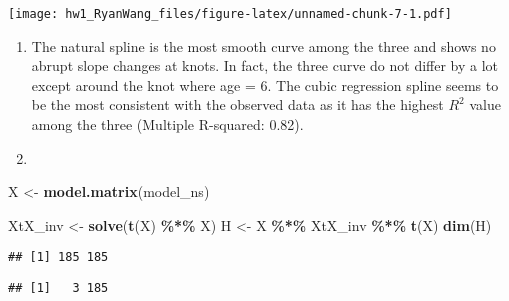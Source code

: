 \documentclass[
]{article}
\newenvironment{Shaded}{\begin{snugshade}}{\end{snugshade}}
\newcommand{\CommentTok}[1]{\textcolor[rgb]{0.56,0.35,0.01}{\textit{#1}}}
\newcommand{\ControlFlowTok}[1]{\textcolor[rgb]{0.13,0.29,0.53}{\textbf{#1}}}
\newcommand{\DecValTok}[1]{\textcolor[rgb]{0.00,0.00,0.81}{#1}}
\newcommand{\FunctionTok}[1]{\textcolor[rgb]{0.13,0.29,0.53}{\textbf{#1}}}
\newcommand{\NormalTok}[1]{#1}
\newcommand{\OtherTok}[1]{\textcolor[rgb]{0.56,0.35,0.01}{#1}}
\newcommand{\SpecialCharTok}[1]{\textcolor[rgb]{0.81,0.36,0.00}{\textbf{#1}}}
\begin{document}
\texttt{[image: hw1\_RyanWang\_files/figure-latex/unnamed-chunk-7-1.pdf]}

\begin{enumerate}
\def\labelenumi{\alph{enumi}.}
\setcounter{enumi}{3}
\item
  The natural spline is the most smooth curve among the three and shows
  no abrupt slope changes at knots. In fact, the three curve do not
  differ by a lot except around the knot where age = 6. The cubic
  regression spline seems to be the most consistent with the observed
  data as it has the highest \(R^2\) value among the three (Multiple
  R-squared: 0.82).
\item
\end{enumerate}

\begin{Shaded}
\begin{Highlighting}[]
\NormalTok{X }\OtherTok{\textless{}{-}} \FunctionTok{model.matrix}\NormalTok{(model\_ns) }

\NormalTok{XtX\_inv }\OtherTok{\textless{}{-}} \FunctionTok{solve}\NormalTok{(}\FunctionTok{t}\NormalTok{(X) }\SpecialCharTok{\%*\%}\NormalTok{ X)}
\NormalTok{H }\OtherTok{\textless{}{-}}\NormalTok{ X }\SpecialCharTok{\%*\%}\NormalTok{ XtX\_inv }\SpecialCharTok{\%*\%} \FunctionTok{t}\NormalTok{(X)}
\FunctionTok{dim}\NormalTok{(H)}
\end{Highlighting}
\end{Shaded}

\begin{verbatim}
## [1] 185 185
\end{verbatim}

\begin{Shaded}
\end{Shaded}

\begin{verbatim}
## [1]   3 185
\end{verbatim}
\end{document}
